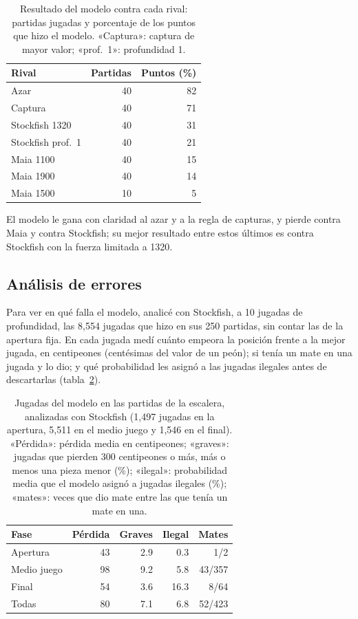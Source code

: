 \documentclass[a4paper,12pt,twocolumn]{article}
\begin{document}
\begin{table}[H]
	\centering
	\footnotesize
	\setlength{\tabcolsep}{3pt}
	\begin{tabular}{lrr}
		\hline
		Rival & Partidas & Puntos (\%) \\
		\hline
		Azar & 40 & 82 \\
		Captura & 40 & 71 \\
		Stockfish 1320 & 40 & 31 \\
		Stockfish prof.~1 & 40 & 21 \\
		Maia 1100 & 40 & 15 \\
		Maia 1900 & 40 & 14 \\
		Maia 1500 & 10 & 5 \\
		\hline
	\end{tabular}
	\caption{Resultado del modelo contra cada rival: partidas jugadas y porcentaje de los puntos que hizo el modelo. «Captura»: captura de mayor valor; «prof.~1»: profundidad 1.}
	\label{tab:rivales}
\end{table}

El modelo le gana con claridad al azar y a la regla de capturas, y pierde contra Maia y contra Stockfish; su mejor resultado entre estos últimos es contra Stockfish con la fuerza limitada a 1320.

\subsection{Análisis de errores}

Para ver en qué falla el modelo, analicé con Stockfish, a 10 jugadas de profundidad, las 8,554 jugadas que hizo en sus 250 partidas, sin contar las de la apertura fija. En cada jugada medí cuánto empeora la posición frente a la mejor jugada, en centipeones (centésimas del valor de un peón); si tenía un mate en una jugada y lo dio; y qué probabilidad les asignó a las jugadas ilegales antes de descartarlas (tabla~\ref{tab:analisis-partidas}).

\begin{table}[H]
	\centering
	\footnotesize
	\setlength{\tabcolsep}{3pt}
	\begin{tabular}{lrrrr}
		\hline
		Fase & Pérdida & Graves & Ilegal & Mates \\
		\hline
		Apertura & 43 & 2.9 & 0.3 & 1/2 \\
		Medio juego & 98 & 9.2 & 5.8 & 43/357 \\
		Final & 54 & 3.6 & 16.3 & 8/64 \\
		\hline
		Todas & 80 & 7.1 & 6.8 & 52/423 \\
		\hline
	\end{tabular}
	\caption{Jugadas del modelo en las partidas de la escalera, analizadas con Stockfish (1,497 jugadas en la apertura, 5,511 en el medio juego y 1,546 en el final). «Pérdida»: pérdida media en centipeones; «graves»: jugadas que pierden 300 centipeones o más, más o menos una pieza menor (\%); «ilegal»: probabilidad media que el modelo asignó a jugadas ilegales (\%); «mates»: veces que dio mate entre las que tenía un mate en una.}
	\label{tab:analisis-partidas}
\end{table}
\end{document}
